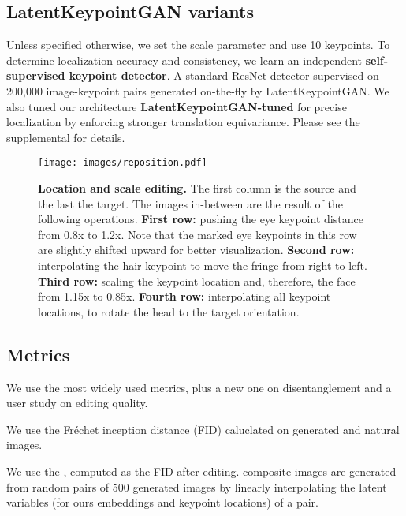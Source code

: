 \documentclass[10pt, conference, compsocconf]{IEEEtran}
\begin{document}
\subsection{LatentKeypointGAN variants}
Unless specified otherwise, we set the scale parameter  and use 10 keypoints. To determine localization accuracy and consistency, we learn an independent \textbf{self-supervised keypoint detector}. A standard ResNet detector \cite{xiao2018simple} supervised on 200,000 image-keypoint pairs generated on-the-fly by LatentKeypointGAN. We also tuned our architecture \textbf{LatentKeypointGAN-tuned} for precise localization by enforcing stronger translation equivariance. Please see the supplemental for details.








\begin{figure}[t]
\begin{center}
  \texttt{[image: images/reposition.pdf]}
  \vspace{-10pt}
\end{center}
  \caption{\textbf{Location and scale editing.} The first column is the source and the last the target. The images in-between are the result of the following operations.
  \textbf{First row:} pushing the eye keypoint distance from 0.8x to 1.2x. Note that the marked eye keypoints in this row are slightly shifted upward for better visualization.
  \textbf{Second row:} interpolating the hair keypoint to move the fringe from right to left. 
  \textbf{Third row:} scaling the keypoint location and, therefore, the face from 1.15x to 0.85x.
  \textbf{Fourth row:} interpolating all keypoint locations, to rotate the head to the target orientation. 
  }
\label{fig:reposition}
\end{figure}

\subsection{Metrics} We use the most widely used metrics, plus a new one on disentanglement and a user study on editing quality.

 We use the Fr\'{e}chet inception distance (FID) \cite{heusel2017gans} 
caluclated on  generated and natural images.

 We use the  \cite{kim2021exploiting}, computed as the FID after editing.  composite images are generated from random pairs of 500 generated images by linearly interpolating the latent variables (for ours embeddings and keypoint locations) of a pair. 
\end{document}
